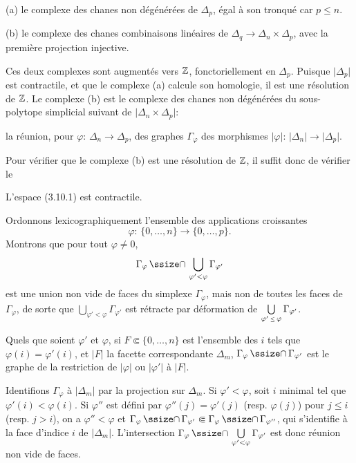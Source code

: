 \medskip\noindent
{\sans (a)}\enspace
le complexe des cha{\hati}nes non
d\'eg\'en\'er\'ees de $\Delta_p$, \'egal \`a
son tronqu\'e car $p\le n$.

\smallskip\noindent
{\sans (b)}\enspace
le complexe des cha{\hati}nes combinaisons
lin\'eaires de
$\Delta_q\to\Delta_n\times\Delta_p$, avec la
premi\`ere projection injective.

\medskip
Ces deux complexes sont augment\'es vers ${\Bbb Z}$,
fonctoriellement en $\Delta_p$.
Puisque $\vert\Delta_p\vert$ est contractile,
et que le complexe (a) calcule son homologie,
il est une r\'esolution de ${\Bbb Z}$.
Le complexe (b) est le complexe des
cha{\hati}nes non d\'eg\'en\'er\'ees du
sous-polytope simplicial suivant de
$\vert\Delta_n\times\Delta_p\vert$:

\parindent=40pt
\medskip\noindent
{}
la r\'eunion, pour $\varphi\colon\,
\Delta_n\to\Delta_p$, des graphes
$\Gamma_\varphi$ des morphismes
$\vert\varphi\vert\colon\,\vert\Delta_n\vert\to
\vert\Delta_p\vert$.

\parindent=20pt
\medskip
Pour v\'erifier que le complexe (b) est une
r\'esolution de ${\Bbb Z}$, il suffit donc de
v\'erifier le

L'espace (3.10.1) est contractile.
\endproclaim

Ordonnons lexicographiquement l'ensemble des
applications croissantes
$$
\varphi\colon\,\{0,\dotsc,n\}\to
\{0,\dotsc,p\}.
$$
Montrons que pour tout $\varphi\not=0$,
$$
\Gamma_\varphi\CAP\bigcup\limits_{\varphi' < \varphi}
\Gamma_{\varphi'}
$$
est une union non vide de faces du simplexe
$\Gamma_{\varphi}$, mais non de toutes les faces
de $\Gamma_\varphi$, de sorte que
$\bigcup\limits_{\varphi'<\varphi}\Gamma_{\varphi'}$
est r\'etracte par d\'eformation de
$\bigcup\limits_{\varphi'\Le
\varphi}\Gamma_{\varphi'}$.

Quels que soient $\varphi'$ et $\varphi$, si
$F\Subset\{0,\dotsc,n\}$ est l'ensemble des
$i$ tels que $\varphi(i)=\varphi'(i)$, et
$\vert F\vert$ la facette correspondante
$\Delta_m$, $\Gamma_\varphi\CAP
\Gamma_{\varphi'}$ est le graphe de la
restriction de $\vert\varphi\vert$ ou
$\vert\varphi'\vert$ \`a $\vert F\vert$.

Identifions $\Gamma_\varphi$ \`a
$\vert\Delta_m\vert$ par la projection sur
$\Delta_m$.
Si $\varphi'<\varphi$, soit $i$ minimal tel
que $\varphi'(i)<\varphi(i)$.
Si $\varphi''$ est d\'efini par
$\varphi''(j)=\varphi'(j)$ (resp.
$\varphi(j)$) pour $j\le i$ (resp. $j>i$), on
a $\varphi''<\varphi$ et
$\Gamma_\varphi\CAP\Gamma_{\varphi'}\Subset
\Gamma_\varphi\CAP\Gamma_{\varphi''}$, qui
s'identifie \`a la face d'indice $i$ de
$\vert\Delta_m\vert$.
L'intersection
$\Gamma_\varphi\CAP\bigcup\limits_{\varphi'<\varphi}
\Gamma_{\varphi'}$ est donc r\'eunion non vide
de faces.

